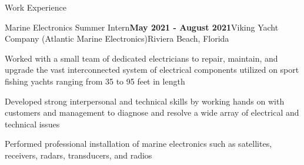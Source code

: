 \documentclass{resume} %
\begin{document}
\begin{rSection}{Work Experience}



	
		
		
	
	

		

	\begin{rSubsection}{Marine Electronics Summer Intern}{\bf  May 2021 - August 2021}{Viking Yacht Company (Atlantic Marine Electronics)}{Riviera Beach, Florida}\smallskip	
		\item Worked with a small team of dedicated electricians to repair, maintain, and upgrade the vast interconnected system of electrical components utilized on sport fishing yachts ranging from 35 to 95 feet in length	
		\item Developed strong interpersonal and technical skills by working hands on with customers and management to diagnose and resolve a wide array of electrical and technical issues	
		\item Performed professional installation of marine electronics such as satellites, receivers, radars, transducers, and radios	
	\end{rSubsection}
	

\end{rSection}
\end{document}
